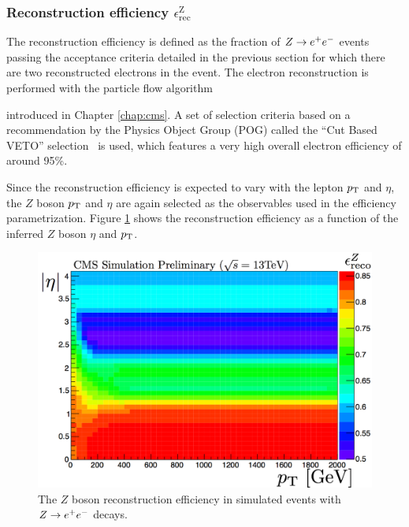 \subsubsection{Reconstruction efficiency $\epsilon^{\text{Z}}_{\text{rec}}$}
The reconstruction efficiency is defined as the fraction of $Z\rightarrow e^+e^-$ events passing the acceptance criteria detailed in the previous section for which there are two reconstructed electrons in the event. The electron reconstruction is performed with the particle flow algorithm~{\cite{Beaudette:2014cea} introduced in Chapter \ref{chap:cms}. A set of selection criteria based on a recommendation by the Physics Object Group (POG) called the ``Cut Based VETO'' selection~\cite{bib:ElectronID} is used, which features a very high overall electron efficiency of around 95\%. 

Since the reconstruction efficiency is expected to vary with the lepton $p_{\text{T}}$ and $\eta$, the $Z$ boson $p_{\text{T}}$ and $\eta$ are again selected as the observables used in the efficiency parametrization. Figure \ref{fig:ZeeReconstruction} shows the reconstruction efficiency as a function of the inferred $Z$ boson $\eta$ and $p_{\text{T}}$. 
\begin{figure}[h]
\centering
\includegraphics[width=0.7\linewidth]{figures/SusySearches/HadStop2015/ZeeReconstruction.png}
\caption{The $Z$ boson reconstruction efficiency in simulated events with $Z\rightarrow e^+e^-$ decays.}
\label{fig:ZeeReconstruction}
\end{figure}
\FloatBarrier

}
